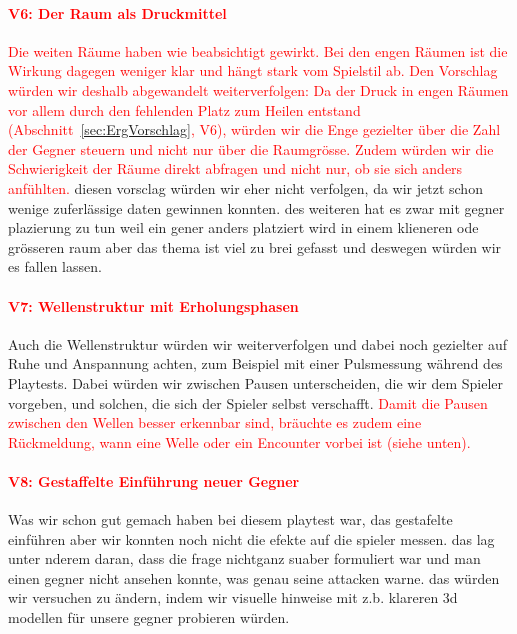 \documentclass[../Main.tex]{subfiles}
\begin{document}
\paragraph{\textcolor{red}{V6: Der Raum als Druckmittel}}
\textcolor{red}{Die weiten Räume haben wie beabsichtigt gewirkt. Bei den engen Räumen ist die Wirkung dagegen weniger klar und hängt stark vom Spielstil ab. Den Vorschlag würden wir deshalb abgewandelt weiterverfolgen: Da der Druck in engen Räumen vor allem durch den fehlenden Platz zum Heilen entstand (Abschnitt~\ref{sec:ErgVorschlag}, V6), würden wir die Enge gezielter über die Zahl der Gegner steuern und nicht nur über die Raumgrösse. Zudem würden wir die Schwierigkeit der Räume direkt abfragen und nicht nur, ob sie sich anders anfühlten.} diesen vorsclag würden wir eher nicht verfolgen, da wir jetzt schon wenige zuferlässige daten gewinnen konnten. des weiteren hat es zwar mit gegner plazierung zu tun weil ein gener anders platziert wird in einem klieneren ode grösseren raum aber das thema ist viel zu brei gefasst  und deswegen würden wir es fallen lassen.

\paragraph{\textcolor{red}{V7: Wellenstruktur mit Erholungsphasen}}
Auch die Wellenstruktur würden wir weiterverfolgen und dabei noch gezielter auf Ruhe und Anspannung achten, zum Beispiel mit einer Pulsmessung während des Playtests.\autocite[285--287]{drachen2018gamesuserresearch} Dabei würden wir zwischen Pausen unterscheiden, die wir dem Spieler vorgeben, und solchen, die sich der Spieler selbst verschafft. \textcolor{red}{Damit die Pausen zwischen den Wellen besser erkennbar sind, bräuchte es zudem eine Rückmeldung, wann eine Welle oder ein Encounter vorbei ist (siehe unten).}

\paragraph{\textcolor{red}{V8: Gestaffelte Einführung neuer Gegner}}
Was wir schon gut gemach haben bei diesem playtest war, das gestafelte einführen aber wir konnten noch nicht die efekte auf die spieler messen. das lag unter nderem daran, dass die frage nichtganz suaber formuliert war und man einen gegner nicht ansehen konnte, was genau seine attacken warne. das würden wir versuchen zu ändern, indem wir visuelle hinweise mit z.b. klareren 3d modellen für unsere gegner probieren würden.
\end{document}

